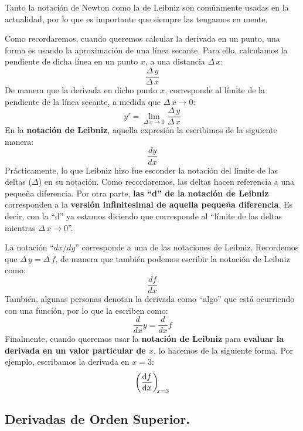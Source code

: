 \documentclass[12pt]{article}
\begin{document}
Tanto la notación de Newton como la de Leibniz son comúnmente usadas en la actualidad, por lo que es importante que siempre las tengamos en mente.

Como recordaremos, cuando queremos calcular la derivada en un punto, una forma es usando la aproximación de una línea secante. Para ello, calculamos la pendiente de dicha línea en un punto $x$, a una distancia $\Delta \, x$:
\[\frac{\Delta \, y}{\Delta \, x}\]
De manera que la derivada en dicho punto $x$, corresponde al límite de la pendiente de la línea secante, a medida que $\Delta \, x \to 0$:
\[y' = \lim_{\Delta \, x \to 0} \frac{\Delta \, y}{\Delta \, x}\]
En la \textbf{notación de Leibniz}, aquella expresión la escribimos de la siguiente manera:
\[\frac{dy}{dx}\]
Prácticamente, lo que Leibniz hizo fue esconder la notación del límite de las deltas ($\Delta$) en su notación. Como recordaremos, las deltas hacen referencia a una pequeña diferencia. Por otra parte, \textbf{las ``d'' de la notación de Leibniz} corresponden a la \textbf{versión infinitesimal de aquella pequeña diferencia}. Es decir, con la ``d'' ya estamos diciendo que corresponde al ``límite de las deltas mientras $\Delta \, x \to 0$''.

La notación ``$dx/dy$'' corresponde a una de las notaciones de Leibniz. Recordemos que $\Delta \, y = \Delta \, f$, de manera que también podemos escribir la notación de Leibniz como:
\[\frac{df}{dx}\]
También, algunas personas denotan la derivada como ``algo'' que está ocurriendo con una función, por lo que la escriben como:
\[\frac{d}{dx}y = \frac{d}{dx}f\]
Finalmente, cuando queremos usar la \textbf{notación de Leibniz} para \textbf{evaluar la derivada en un valor particular de $x$}, lo hacemos de la siguiente forma. Por ejemplo, escribamos la derivada en $x = 3$:
\[\diff fx[x = 3]\]



\subsection{Derivadas de Orden Superior.}
\end{document}

